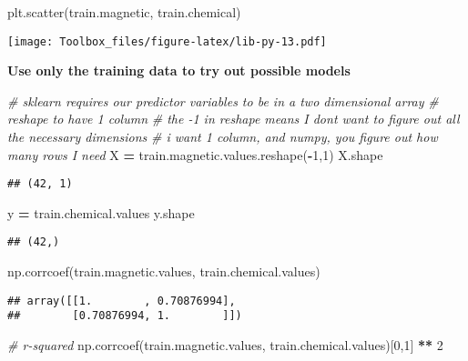 \documentclass[
]{book}
\newenvironment{Shaded}{\begin{snugshade}}{\end{snugshade}}
\newcommand{\CommentTok}[1]{\textcolor[rgb]{0.56,0.35,0.01}{\textit{#1}}}
\newcommand{\DecValTok}[1]{\textcolor[rgb]{0.00,0.00,0.81}{#1}}
\newcommand{\NormalTok}[1]{#1}
\newcommand{\OperatorTok}[1]{\textcolor[rgb]{0.81,0.36,0.00}{\textbf{#1}}}
\begin{document}
\begin{Shaded}
\begin{Highlighting}[]
\NormalTok{plt.scatter(train.magnetic, train.chemical)}
\end{Highlighting}
\end{Shaded}

\texttt{[image: Toolbox\_files/figure-latex/lib-py-13.pdf]}

\textbf{Use only the training data to try out possible models}

\begin{Shaded}
\begin{Highlighting}[]
\CommentTok{\# sklearn requires our predictor variables to be in a two dimensional array}
\CommentTok{\# reshape to have 1 column}
\CommentTok{\# the {-}1 in reshape means I don\textquotesingle{}t want to figure out all the necessary dimensions}
\CommentTok{\# i want 1 column, and numpy, you figure out how many rows I need}
\NormalTok{X }\OperatorTok{=}\NormalTok{ train.magnetic.values.reshape(}\OperatorTok{{-}}\DecValTok{1}\NormalTok{,}\DecValTok{1}\NormalTok{)}
\NormalTok{X.shape}
\end{Highlighting}
\end{Shaded}

\begin{verbatim}
## (42, 1)
\end{verbatim}

\begin{Shaded}
\begin{Highlighting}[]
\NormalTok{y }\OperatorTok{=}\NormalTok{ train.chemical.values}
\NormalTok{y.shape}
\end{Highlighting}
\end{Shaded}

\begin{verbatim}
## (42,)
\end{verbatim}

\begin{Shaded}
\begin{Highlighting}[]
\NormalTok{np.corrcoef(train.magnetic.values, train.chemical.values)}
\end{Highlighting}
\end{Shaded}

\begin{verbatim}
## array([[1.        , 0.70876994],
##        [0.70876994, 1.        ]])
\end{verbatim}

\begin{Shaded}
\begin{Highlighting}[]
\CommentTok{\# r{-}squared}
\NormalTok{np.corrcoef(train.magnetic.values, train.chemical.values)[}\DecValTok{0}\NormalTok{,}\DecValTok{1}\NormalTok{] }\OperatorTok{**} \DecValTok{2}
\end{Highlighting}
\end{Shaded}
\end{document}

